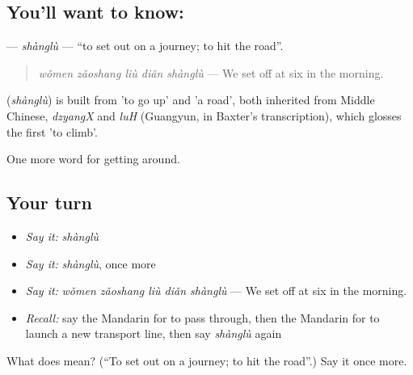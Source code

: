 \subsection*{You'll want to know: }
\textbf{} — \emph{shànglù} — \textquotedblleft{}to set out on a journey; to hit the road\textquotedblright{}.

\begin{quote}
\textbf{} \emph{wǒmen zǎoshang liù diǎn shànglù} — We set off at six in the morning.
\end{quote}

\begin{cousinweb}
\textbf{} (\emph{shànglù}) is built from  'to go up' and  'a road', both inherited from Middle Chinese, \emph{dzyangX} and \emph{luH} (Guangyun, in Baxter's transcription), which glosses the first 'to climb'.
\end{cousinweb}

\begin{grammarlens}[title={What you've built}]
One more word for getting around.
\end{grammarlens}

\subsection*{Your turn}
\begin{itemize}
\raggedright
  \item \emph{Say it:} \emph{shànglù}
  \item \emph{Say it:} \emph{shànglù}, once more
  \item \emph{Say it:} \emph{wǒmen zǎoshang liù diǎn shànglù} — We set off at six in the morning.
  \item \emph{Recall:} say the Mandarin for to pass through, then the Mandarin for to launch a new transport line, then say \emph{shànglù} again
\end{itemize}

\begin{tcolorbox}[breakable,colback=teal!4,colframe=teal!35!black,title={Before you move on}]
What does  mean? (\textquotedblleft{}To set out on a journey; to hit the road\textquotedblright{}.) Say it once more.
\end{tcolorbox}
